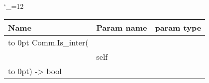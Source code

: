 \begingroup \catcode`\_=12 \tt
\begin{tabular}{lll}
\toprule
\textrm{Name}&\textrm{Param name}&\textrm{param type}\\
\midrule
\hbox to 0pt {Comm.Is_inter(\hss}\\
& self\\
\hbox to 0pt{) -> bool\hss}\\
\bottomrule
\end{tabular}
\endgroup
